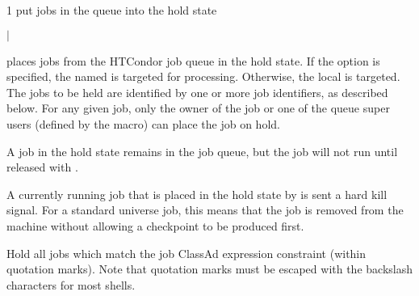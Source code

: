 \begin{ManPage}{\label{man-condor-hold}}{1}
{put jobs in the queue into the hold state}
\Synopsis {}
\ToolArgsBase

\ToolDebugOption
{}
\ToolLocate 
\ToolJobs
$|$  \Dots 

\ToolDebugOption
{}
\ToolLocate 
\ToolAll


\Description

 places jobs from the HTCondor job queue in
the hold state.
If the  option is specified, the named  is targeted
for processing.  
Otherwise, the local  is targeted.
The jobs to be held are identified by one or more job identifiers, as
described below.
For any given job, only the owner of the job or one of the queue super users
(defined by the  macro) can place the job on hold.

A job in the hold state remains in the job queue,
but the job will not run until released with .

A currently running job that is placed in the hold state by 
is sent a hard kill signal.
For a standard universe job,
this means that the job is removed from the machine without
allowing a checkpoint to be produced first.

\begin{Options}

  \ToolArgsBaseDesc
  \ToolLocateDesc
  \ToolDebugDesc
   {Hold all jobs which match
    the job ClassAd expression constraint (within quotation
    marks).
    Note that quotation marks must be escaped with the
    backslash characters for most shells.  }


\end{Options}
\end{ManPage}
